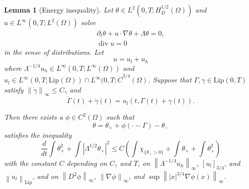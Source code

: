\documentclass[11pt]{amsart}
\newtheorem{lemma}[theorem]{Lemma}
\theoremstyle{remark}
\newcommand{\norm}[1]{\left\lVert#1\right\rVert}
\newcommand{\paren}[1]{\left( #1 \right)}
\newcommand{\bracket}[1]{\left[ #1 \right]}
\newcommand{\abs}[1]{\left\lvert #1 \right\rvert}
\newcommand{\del}{\partial}
\newcommand{\grad}{\nabla}
\newcommand{\ddt}{\frac{d}{dt}}
\renewcommand{\div}{\operatorname{div}}
\newcommand{\Lip}{\text{Lip}}
\newcommand{\indic}[1]{\chi_{\{#1\}}}
\newcommand{\ulow}{u_l}
\newcommand{\uhigh}{u_h}
\begin{document}
\begin{lemma}[Energy inequality]
Let $\theta \in L^2(0,T; H_D^{1/2}(\Omega))$ and $u \in L^\infty(0,T; L^2(\Omega))$ solve
\begin{align*}
\del_t \theta + u\cdot \grad \theta + \Lambda \theta = 0,
\\ \div u = 0
\end{align*}
in the sense of distributions.  Let
\[ u = \ulow + \uhigh \]
where $\Lambda^{-1/4} \uhigh \in L^\infty(0,T; L^\infty(\Omega))$ and $\ulow \in L^\infty(0,T; \Lip(\Omega)) \cap L^\infty(0,T; \dot{C}^{3/4}(\Omega)$.  
Suppose that $\Gamma, \gamma \in \Lip(0,T)$ satisfy $\norm{\dot{\gamma}}_\infty \leq C_\gamma$ and
\[ \dot{\Gamma}(t) + \dot{\gamma}(t) = \ulow(t, \Gamma(t) + \gamma(t)). \]

Then there exists a $\phi \in C^2(\Omega)$ such that
\[ \theta = \theta_+ + \phi(\cdot-\Gamma) - \theta_- \]
satisfies the inequality
\[ \ddt \int \theta_+^2 + \int \abs{\Lambda^{1/2} \theta_+}^2 \leq C \paren{ \int \indic{\theta_+ > 0} + \int \theta_+ + \int \theta_+^2 } \]
with the constant $C$ depending on $C_\gamma$ and $T$, on $\norm{\Lambda^{-1/4} \uhigh}_\infty$, $\bracket{\ulow}_{3/4}$, and $\norm{\ulow}_\Lip$, and on $\norm{D^2 \phi}_\infty$, $\norm{\grad\phi}_\infty$, and $\sup \norm{|x|^{3/4} \grad\phi(x)}_\infty$.  
\end{lemma}
\end{document}
